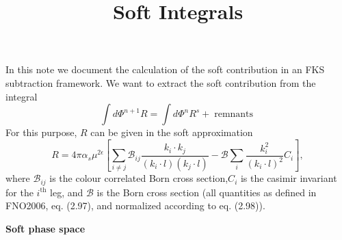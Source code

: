 \documentclass{letter}
\newcommand{\section}[1]{\medskip\bigskip

\noindent\textbf{\LARGE #1}}
\newcommand{\tmop}[1]{\ensuremath{\operatorname{#1}}}
\begin{document}
\title{Soft Integrals}\author{}\maketitle

In this note we document the calculation of the soft contribution in an FKS
subtraction framework. We want to extract the soft contribution from the
integral
\begin{equation}
  \int d \Phi^{n + 1} R = \int d \Phi^n R^s + \tmop{remnants}
\end{equation}
For this purpose, $R$ can be given in the soft approximation
\begin{equation}
  R = 4 \pi \alpha_s \mu^{2 \epsilon}  \left[ \sum_{i \neq j} \mathcal{B}_{i
  j} \frac{k_i \cdot k_j}{(k_i \cdot l) (k_j \cdot l)} - \mathcal{B} \sum_i
  \frac{k_i^2}{(k_i \cdot l)^2} C_i \right],
\end{equation}
where $\mathcal{B}_{i j}$ is the colour correlated Born cross section,$C_i$ is
the casimir invariant for the $i^{\tmop{th}}$ leg, and $\mathcal{B}$ is the
Born cross section (all quantities as defined in FNO2006, eq. (2.97), and
normalized according to eq. (2.98)).



\section{Soft phase space}
\end{document}
